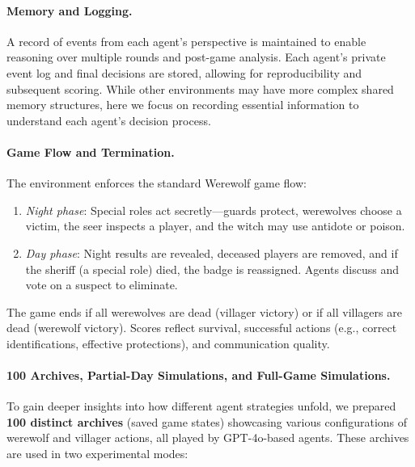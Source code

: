 \paragraph{Memory and Logging.}
A record of events from each agent’s perspective is maintained to enable reasoning over multiple rounds and post-game analysis. Each agent’s private event log and final decisions are stored, allowing for reproducibility and subsequent scoring. While other environments may have more complex shared memory structures, here we focus on recording essential information to understand each agent’s decision process.

\paragraph{Game Flow and Termination.}
The environment enforces the standard Werewolf game flow:
\begin{enumerate}
    \item \emph{Night phase}: Special roles act secretly—guards protect, werewolves choose a victim, the seer inspects a player, and the witch may use antidote or poison.
    \item \emph{Day phase}: Night results are revealed, deceased players are removed, and if the sheriff (a special role) died, the badge is reassigned. Agents discuss and vote on a suspect to eliminate.
\end{enumerate}
The game ends if all werewolves are dead (villager victory) or if all villagers are dead (werewolf victory). Scores reflect survival, successful actions (e.g., correct identifications, effective protections), and communication quality.
\paragraph{100 Archives, Partial-Day Simulations, and Full-Game Simulations.}
To gain deeper insights into how different agent strategies unfold, we prepared \textbf{100 distinct archives} (saved game states) showcasing various configurations of werewolf and villager actions, all played by GPT-4o-based agents. These archives are used in two experimental modes:

